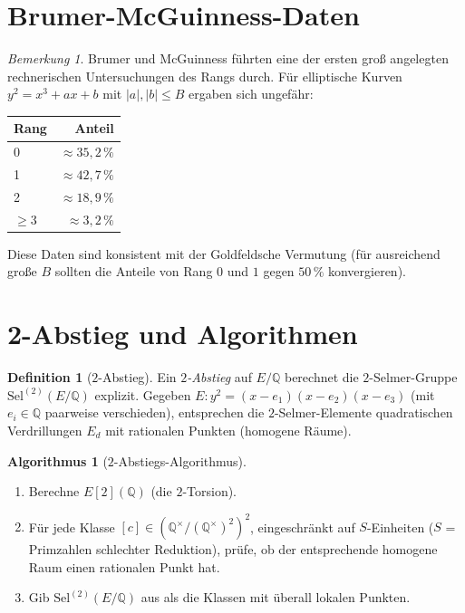 \documentclass[12pt,a4paper]{amsart}
\theoremstyle{definition}
\newtheorem{definition_de}[theorem]{Definition}
\newtheorem{algorithmus}[theorem]{Algorithmus}
\theoremstyle{remark}
\newtheorem{bemerkung}[theorem]{Bemerkung}
\newcommand{\Q}{\mathbb{Q}}
\newcommand{\Sel}{\mathrm{Sel}}
\begin{document}
\section{Brumer-McGuinness-Daten}\label{sec:daten}

\begin{bemerkung}
  Brumer und McGuinness \cite{BM1990} führten eine der ersten groß angelegten
  rechnerischen Untersuchungen des Rangs durch. Für elliptische Kurven
  $y^2 = x^3 + ax + b$ mit $|a|, |b| \leq B$ ergaben sich ungefähr:
  \begin{center}
    \begin{tabular}{lr}
      \toprule
      Rang & Anteil \\
      \midrule
      0 & $\approx 35{,}2\,\%$ \\
      1 & $\approx 42{,}7\,\%$ \\
      2 & $\approx 18{,}9\,\%$ \\
      $\geq 3$ & $\approx 3{,}2\,\%$ \\
      \bottomrule
    \end{tabular}
  \end{center}
  Diese Daten sind konsistent mit der Goldfeldsche Vermutung (für ausreichend große $B$
  sollten die Anteile von Rang $0$ und $1$ gegen $50\,\%$ konvergieren).
\end{bemerkung}

\section{2-Abstieg und Algorithmen}\label{sec:abstieg}

\begin{definition_de}[$2$-Abstieg]
  Ein \emph{$2$-Abstieg} auf $E/\Q$ berechnet die $2$-Selmer-Gruppe
  $\Sel^{(2)}(E/\Q)$ explizit.
  Gegeben $E\colon y^2 = (x-e_1)(x-e_2)(x-e_3)$ (mit $e_i \in \Q$ paarweise
  verschieden), entsprechen die $2$-Selmer-Elemente quadratischen Verdrillungen
  $E_d$ mit rationalen Punkten (homogene Räume).
\end{definition_de}

\begin{algorithmus}[$2$-Abstiegs-Algorithmus]
  \begin{enumerate}[label=(\arabic*)]
    \item Berechne $E[2](\Q)$ (die $2$-Torsion).
    \item Für jede Klasse $[c] \in (\Q^\times / (\Q^\times)^2)^2$, eingeschränkt auf
      $S$-Einheiten ($S$ = Primzahlen schlechter Reduktion), prüfe, ob der entsprechende
      homogene Raum einen rationalen Punkt hat.
    \item Gib $\Sel^{(2)}(E/\Q)$ aus als die Klassen mit überall lokalen Punkten.
  \end{enumerate}
\end{algorithmus}
\end{document}
